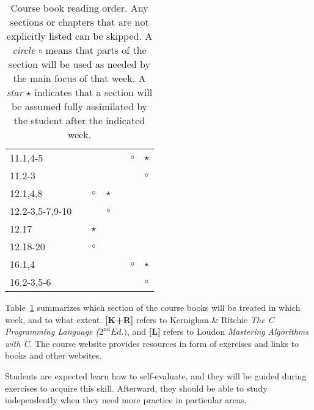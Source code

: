 \documentclass[a4paper]{article}
\newcommand{\refl}{\textbf{[L]}\xspace}
\newcommand{\refkr}{\textbf{[K+R]}\xspace}
\begin{document}
\begin{table}
\begin{minipage}[t]{0.5\columnwidth}
\begin{tabular}{|l|c|c|c|c|c|c|}
    \hline
    11.1,4-5           &         &         &         &         & $\circ$ & $\star$ \\
    11.2-3             &         &         &         &         &         & $\circ$ \\
    \hline
    12.1,4,8           &         & $\circ$ & $\star$ &         &         &         \\
    12.2-3,5-7,9-10    &         &         & $\circ$ &         &         &         \\
    12.17              &         & $\star$ &         &         &         &         \\
    12.18-20           &         & $\circ$ &         &         &         &         \\
    \hline
    16.1,4             &         &         &         &         & $\circ$ & $\star$ \\
    16.2-3,5-6         &         &         &         &         &         & $\circ$ \\
    \hline
  \end{tabular}
  \end{minipage}
  \caption{
    Course book reading order.
    Any sections or chapters that are not explicitly listed can be skipped.
    A \emph{circle} $\circ$ means that parts of the section will be used as needed by the main focus of that week.
    A \emph{star} $\star$ indicates that a section will be assumed fully assimilated by the student after the indicated week.
  }\label{tab:reading-guide}
\end{table}

Table~\ref{tab:reading-guide} summarizes which section of the course books will be treated in which week, and to what extent.
\refkr refers to Kernighan \& Ritchie \emph{The C Programming Language ($2^\text{nd} Ed.)$}, and \refl refers to Loudon \emph{Mastering Algorithms with C}.
The course website provides resources in form of exercises and links to books and other websites.

Students are expected learn how to self-evaluate, and they will be guided during exercises to acquire this skill.
Afterward, they should be able to study independently when they need more practice in particular areas.
\end{document}
